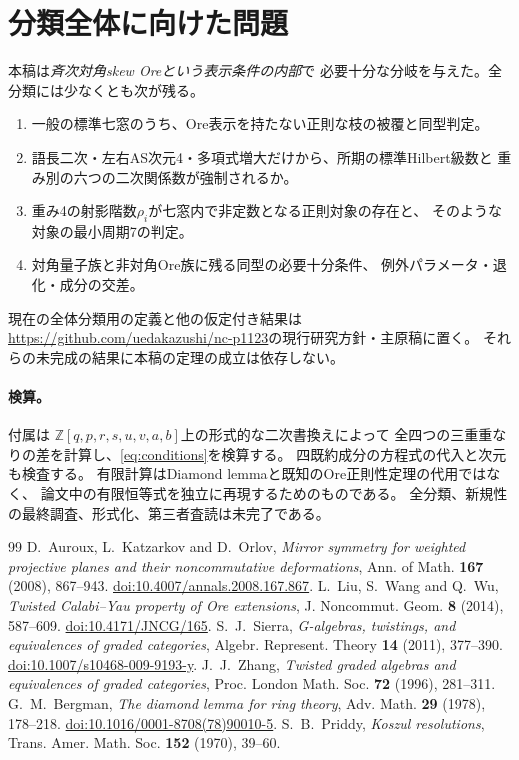 \documentclass[11pt,a4paper]{ltjsarticle}
\theoremstyle{definition}
\newcommand{\ZZ}{\mathbb Z}
\begin{document}
\section{分類全体に向けた問題}
本稿は\emph{斉次対角skew Oreという表示条件の内部}で
必要十分な分岐を与えた。全分類には少なくとも次が残る。
\begin{enumerate}
\item 一般の標準七窓のうち、Ore表示を持たない正則な枝の被覆と同型判定。
\item 語長二次・左右AS次元4・多項式増大だけから、所期の標準Hilbert級数と
重み別の六つの二次関係数が強制されるか。
\item 重み4の射影階数$\rho_i$が七窓内で非定数となる正則対象の存在と、
そのような対象の最小周期7の判定。
\item 対角量子族と非対角Ore族に残る同型の必要十分条件、
例外パラメータ・退化・成分の交差。
\end{enumerate}
現在の全体分類用の定義と他の仮定付き結果は
\url{https://github.com/uedakazushi/nc-p1123}の現行研究方針・主原稿に置く。
それらの未完成の結果に本稿の定理の成立は依存しない。

\paragraph{検算。}
付属は
$\ZZ[q,p,r,s,u,v,a,b]$上の形式的な二次書換えによって
全四つの三重重なりの差を計算し、\eqref{eq:conditions}を検算する。
四既約成分の方程式の代入と次元も検査する。
有限計算はDiamond lemmaと既知のOre正則性定理の代用ではなく、
論文中の有限恒等式を独立に再現するためのものである。
全分類、新規性の最終調査、形式化、第三者査読は未完了である。

\begin{thebibliography}{99}
D.~Auroux, L.~Katzarkov and D.~Orlov,
\emph{Mirror symmetry for weighted projective planes and their noncommutative deformations},
Ann. of Math. \textbf{167} (2008), 867--943.
\href{https://doi.org/10.4007/annals.2008.167.867}{doi:10.4007/annals.2008.167.867}.
L.~Liu, S.~Wang and Q.~Wu,
\emph{Twisted Calabi--Yau property of Ore extensions},
J. Noncommut. Geom. \textbf{8} (2014), 587--609.
\href{https://doi.org/10.4171/JNCG/165}{doi:10.4171/JNCG/165}.
S.~J.~Sierra, \emph{G-algebras, twistings, and equivalences of graded categories},
Algebr. Represent. Theory \textbf{14} (2011), 377--390.
\href{https://doi.org/10.1007/s10468-009-9193-y}{doi:10.1007/s10468-009-9193-y}.
J.~J.~Zhang, \emph{Twisted graded algebras and equivalences of graded categories},
Proc. London Math. Soc. \textbf{72} (1996), 281--311.
G.~M.~Bergman, \emph{The diamond lemma for ring theory},
Adv. Math. \textbf{29} (1978), 178--218.
\href{https://doi.org/10.1016/0001-8708(78)90010-5}{doi:10.1016/0001-8708(78)90010-5}.
S.~B.~Priddy, \emph{Koszul resolutions},
Trans. Amer. Math. Soc. \textbf{152} (1970), 39--60.
\end{thebibliography}
\end{document}
